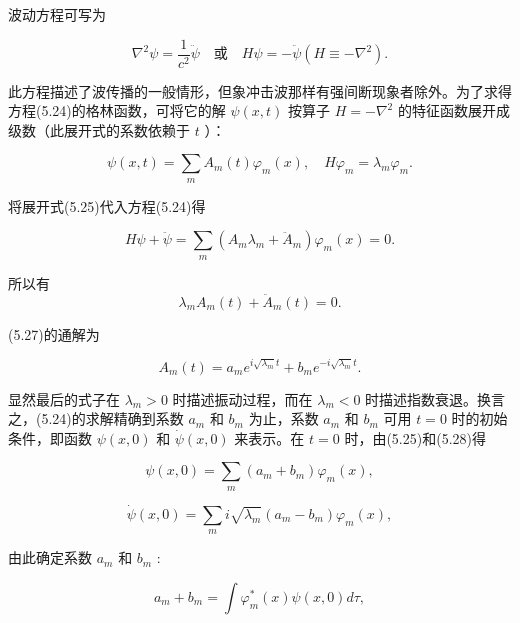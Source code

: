 波动方程可写为

\begin{equation*}
\nabla^ {2} \psi = \frac {1}{c ^ {2}} \ddot {\psi} \quad \text {或} \quad H \psi = - \ddot {\psi} (H \equiv - \nabla^ {2}).\tag{5.24}
\end{equation*}

此方程描述了波传播的一般情形，但象冲击波那样有强间断现象者除外。为了求得方程(5.24)的格林函数，可将它的解 $\psi(x, t)$ 按算子 $H = -\nabla^2$ 的特征函数展开成级数（此展开式的系数依赖于 $t$ ）：

\begin{equation*}
\psi (x, t) = \sum_ {m} A _ {m} (t) \varphi_ {m} (x), \quad H \varphi_ {m} = \lambda_ {m} \varphi_ {m}.\tag{5.25}
\end{equation*}

将展开式(5.25)代入方程(5.24)得

\begin{equation*}
H \psi + \ddot {\psi} = \sum_ {m} (A _ {m} \lambda_ {m} + \ddot {A} _ {m}) \varphi_ {m} (x) = 0.\tag{5.26}
\end{equation*}

所以有
\begin{equation*}
\lambda_ {m} A _ {m} (t) + \ddot {A} _ {m} (t) = 0.\tag{5.27}
\end{equation*}

(5.27)的通解为

\begin{equation*}
A _ {m} (t) = a _ {m} e ^ {i \sqrt {\lambda_ {m}} t} + b _ {m} e ^ {- i \sqrt {\lambda_ {m}} t}.\tag{5.28}
\end{equation*}

显然最后的式子在 $\lambda_{m} > 0$ 时描述振动过程，而在 $\lambda_{m} < 0$ 时描述指数衰退。换言之，(5.24)的求解精确到系数 $a_{m}$ 和 $b_{m}$ 为止，系数 $a_{m}$ 和 $b_{m}$ 可用 $t = 0$ 时的初始条件，即函数 $\psi(x,0)$ 和 $\dot {\psi} (x,0)$ 来表示。在 $t = 0$ 时，由(5.25)和(5.28)得

\begin{equation*}
\psi (x, 0) = \sum_ {m} \left(a _ {m} + b _ {m}\right) \varphi_ {m} (x),
\end{equation*}

\begin{equation*}
\dot {\psi} (x, 0) = \sum_ {m} i \sqrt {\lambda_ {m}} (a _ {m} - b _ {m}) \varphi_ {m} (x),
\end{equation*}

由此确定系数 $a_{m}$ 和 $b_{m}$ :

\begin{equation*}
a _ {m} + b _ {m} = \int \varphi_ {m} ^ {*} (x) \psi (x, 0) d \tau ,
\end{equation*}

